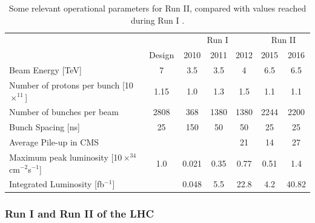  
\begin{table}[ht]
\begin{center}
\begin{tabular}{|l|c|c|c|c|c|c|} \hline \hline
                                                     &                &                 \multicolumn{3}{|c|}{Run I}            &  \multicolumn{2}{|c|}{Run II}        \\    \cline{3-7}
                                                     &     Design     &       2010      &       2011       &       2012        &       2015       &       2016        \\     \hline \hline   
   Beam Energy [TeV]                                 &        7       &       3.5       &        3.5       &          4        &        6.5       &        6.5        \\ 
   Number of protons per bunch [10$\times^{11}$]     &      1.15      &       1.0       &        1.3       &        1.5        &        1.1       &        1.1        \\
   Number of bunches per beam                        &      2808      &       368       &       1380       &       1380        &       2244       &       2200        \\
   Bunch Spacing [ns]                                &        25      &       150       &         50       &         50        &         25       &        25         \\
   Average Pile-up in CMS                            &                &                 &                  &         21        &         14       &        27        \\
   Maximum peak luminosity [10$\times^{34}$ cm$^{-2}$s$^{-1}$] & 1.0  &       0.021     &        0.35      &         0.77      &        0.51      &       1.4        \\
   Integrated Luminosity [fb$^{-1}$]                 &                &       0.048     &         5.5      &         22.8      &         4.2      &       40.82       \\  \hline \hline
\end{tabular}
\end{center}
\caption{Some relevant operational parameters for Run II, compared with values reached during Run I \cite{chp2:LHCparameters}.}\label{chp2:LHCtable}
\end{table}

\subsubsection{Run I and Run II of the LHC}

